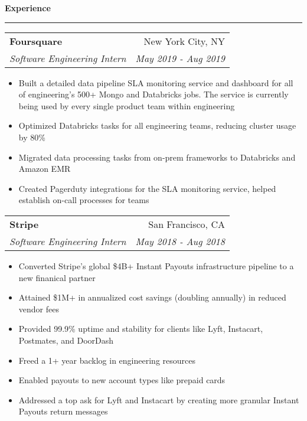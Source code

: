 \documentclass[11pt,letterpaper]{article}
\makeatletter
\newenvironment{topic}[1]
    {
    {\Large \centerline{#1}}
    \vspace*{0.03in}
    \hrule 
    \vspace*{0.05in}
    }
    {}
\newenvironment{event}
    {
    \begin{tabular*}{\textwidth}{l@{\extracolsep{\fill}}r}
    }
    {
    \end{tabular*}
    }
\makeatother
\begin{document}
    \begin{topic}{\textbf{Experience}}
        \begin{event}
            \textbf{Foursquare} & New York City, NY \\
            \emph{Software Engineering Intern} & \emph{May 2019 - Aug 2019} \\
        \end{event}
            \begin{itemize}
                \item Built a detailed data pipeline SLA monitoring service and dashboard for all of engineering's 500+ Mongo and Databricks jobs. The service is currently being used by every single product team within engineering
                \item Optimized Databricks tasks for all engineering teams, reducing cluster usage by 80\%
                \item Migrated data processing tasks from on-prem frameworks to Databricks and Amazon EMR
                \item Created Pagerduty integrations for the SLA monitoring service, helped establish on-call processes for teams
            \end{itemize}

        \begin{event}
            \textbf{Stripe} & San Francisco, CA \\
            \emph{Software Engineering Intern} & \emph{May 2018 - Aug 2018} \\
        \end{event}
            \begin{itemize}
                \item Converted Stripe's global \$4B+ Instant Payouts infrastructure pipeline to a new finanical partner
                \setlength{\itemindent}{0.21in}
                \item Attained \$1M+ in annualized cost savings (doubling annually) in reduced vendor fees
                \item Provided 99.9\% uptime and stability for clients like Lyft, Instacart, Postmates, and DoorDash
                \item Freed a 1+ year backlog in engineering resources
                \item Enabled payouts to new account types like prepaid cards
                \setlength{\itemindent}{0in}
                \item Addressed a top ask for Lyft and Instacart by creating more granular Instant Payouts return messages
            \end{itemize}
            

\end{topic}
\end{document}
